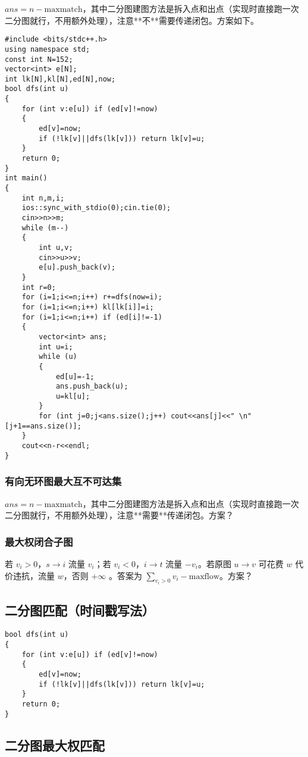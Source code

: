 \documentclass[12pt]{ctexart}
\begin{document}
$ans=n-\text{maxmatch}$，其中二分图建图方法是拆入点和出点（实现时直接跑一次二分图就行，不用额外处理），注意**不**需要传递闭包。方案如下。

\begin{lstlisting}
#include <bits/stdc++.h>
using namespace std;
const int N=152;
vector<int> e[N];
int lk[N],kl[N],ed[N],now;
bool dfs(int u)
{
	for (int v:e[u]) if (ed[v]!=now)
	{
		ed[v]=now;
		if (!lk[v]||dfs(lk[v])) return lk[v]=u;
	}
	return 0;
}
int main()
{
	int n,m,i;
	ios::sync_with_stdio(0);cin.tie(0);
	cin>>n>>m;
	while (m--)
	{
		int u,v;
		cin>>u>>v;
		e[u].push_back(v);
	}
	int r=0;
	for (i=1;i<=n;i++) r+=dfs(now=i);
	for (i=1;i<=n;i++) kl[lk[i]]=i;
	for (i=1;i<=n;i++) if (ed[i]!=-1)
	{
		vector<int> ans;
		int u=i;
		while (u)
		{
			ed[u]=-1;
			ans.push_back(u);
			u=kl[u];
		}
		for (int j=0;j<ans.size();j++) cout<<ans[j]<<" \n"[j+1==ans.size()];
	}
	cout<<n-r<<endl;
}
\end{lstlisting}

\subsubsection{有向无环图最大互不可达集}

$ans=n-\text{maxmatch}$，其中二分图建图方法是拆入点和出点（实现时直接跑一次二分图就行，不用额外处理），注意**需要**传递闭包。方案？

\subsubsection{最大权闭合子图}

若 $v_i>0$，$s\to i$ 流量 $v_i$；若 $v_i<0$，$i\to t$ 流量 $-v_i$。若原图 $u\to v$ 可花费 $w$ 代价违抗，流量 $w$，否则 $+\infty$ 。答案为 $\sum\limits_{v_i>0} v_i-\text{maxflow}$。方案？

\subsection{二分图匹配（时间戳写法）}

\begin{lstlisting}
bool dfs(int u)
{
	for (int v:e[u]) if (ed[v]!=now)
	{
		ed[v]=now;
		if (!lk[v]||dfs(lk[v])) return lk[v]=u;
	}
	return 0;
}
\end{lstlisting}

\subsection{二分图最大权匹配}
\end{document}
